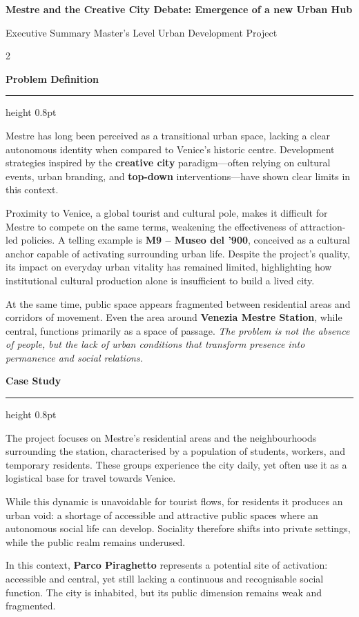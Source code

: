 \documentclass[10pt]{article}
\newcommand{\key}[1]{\textcolor{Accent}{\bfseries #1}}
\newcommand{\emphit}[1]{\textit{#1}}
\newcommand{\HeaderBar}[2]{%
  \noindent\colorbox{Primary}{%
    \parbox{\dimexpr\linewidth-2\fboxsep\relax}{%
      \vspace{2pt}%
      {\color{white}\fontsize{18}{21}\selectfont\bfseries #1\par}%
      \vspace{2pt}%
      {\color{white!85}\normalsize #2\par}%
      \vspace{2pt}%
    }%
  }\par
}
\newcommand{\SectionTitle}[1]{%
  \vspace{2pt}%
  {\color{Primary}\bfseries #1\par}%
  \vspace{2pt}%
  {\color{Rule}\hrule height 0.8pt}\vspace{4pt}%
}
\begin{document}
\color{Text}


\HeaderBar{Mestre and the Creative City Debate: Emergence of a new Urban Hub}{Executive Summary \textemdash{} Master’s Level Urban Development Project}

\vspace{6pt}

\begin{multicols}{2}
\justifying

\SectionTitle{Problem Definition}
Mestre has long been perceived as a transitional urban space, lacking a clear autonomous identity when compared to Venice’s historic centre. Development strategies inspired by the \key{creative city} paradigm---often relying on cultural events, urban branding, and \key{top-down} interventions---have shown clear limits in this context.

Proximity to Venice, a global tourist and cultural pole, makes it difficult for Mestre to compete on the same terms, weakening the effectiveness of attraction-led policies. A telling example is \key{M9 -- Museo del ’900}, conceived as a cultural anchor capable of activating surrounding urban life. Despite the project’s quality, its impact on everyday urban vitality has remained limited, highlighting how institutional cultural production alone is insufficient to build a lived city.

At the same time, public space appears fragmented between residential areas and corridors of movement. Even the area around \key{Venezia Mestre Station}, while central, functions primarily as a space of passage. \emphit{The problem is not the absence of people, but the lack of urban conditions that transform presence into permanence and social relations.}

\SectionTitle{Case Study}
The project focuses on Mestre’s residential areas and the neighbourhoods surrounding the station, characterised by a population of students, workers, and temporary residents. These groups experience the city daily, yet often use it as a logistical base for travel towards Venice.

While this dynamic is unavoidable for tourist flows, for residents it produces an urban void: a shortage of accessible and attractive public spaces where an autonomous social life can develop. Sociality therefore shifts into private settings, while the public realm remains underused.

In this context, \key{Parco Piraghetto} represents a potential site of activation: accessible and central, yet still lacking a continuous and recognisable social function. The city is inhabited, but its public dimension remains weak and fragmented.


\end{multicols}
\end{document}
